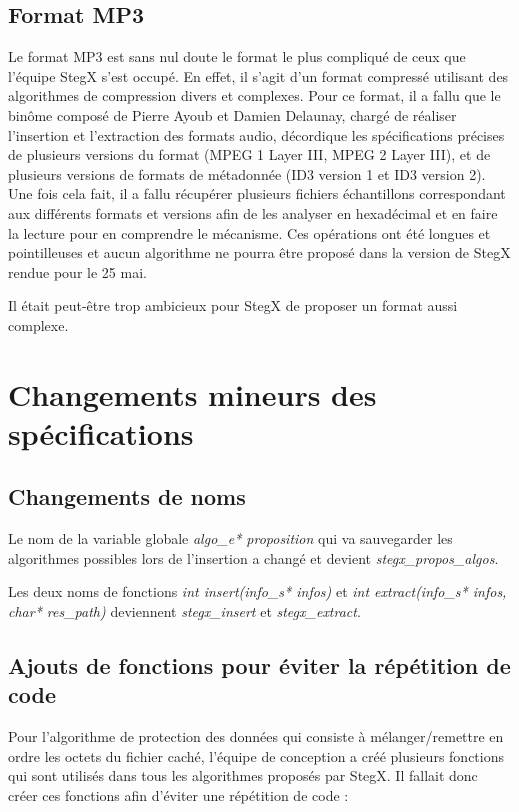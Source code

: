 \documentclass[11pt]{article}
\begin{document}
\subsection{Format MP3}

Le format MP3 est sans nul doute le format le plus compliqué de ceux
que l'équipe StegX s'est occupé. En effet, il s'agit d'un format compressé 
utilisant des algorithmes de compression divers et complexes. 
Pour ce format, il a fallu que le binôme composé de Pierre Ayoub et Damien 
Delaunay, chargé de réaliser l'insertion et l'extraction des formats audio, 
décordique les spécifications précises de plusieurs versions du format 
(MPEG 1 Layer III, MPEG 2 Layer III), et de plusieurs versions de formats 
de métadonnée (ID3 version 1 et ID3 version 2). 
Une fois cela fait, il a fallu récupérer plusieurs fichiers échantillons 
correspondant aux différents formats et versions afin de les analyser en 
hexadécimal et en faire la lecture pour en comprendre le mécanisme. Ces 
opérations ont été longues et pointilleuses et aucun algorithme ne pourra 
être proposé dans la version de StegX rendue pour le 25 mai. 

Il était peut-être trop ambicieux pour StegX de proposer un format aussi 
complexe. 

\section{Changements mineurs des spécifications}

\subsection{Changements de noms}

Le nom de la variable globale \textit{algo\_e* proposition} qui va sauvegarder 
les algorithmes possibles lors de l'insertion a changé et devient 
\textit{stegx\_propos\_algos}. 

Les deux noms de fonctions \textit{int insert(info\_s* infos)} et 
\textit{int extract(info\_s* infos, char* res\_path)} deviennent 
\textit{stegx\_insert} et \textit{stegx\_extract}. 

\subsection{Ajouts de fonctions pour éviter la répétition de code}

Pour l'algorithme de protection des données qui consiste à mélanger/remettre
en ordre les octets du fichier caché, l'équipe de conception a créé plusieurs 
fonctions qui sont utilisés dans tous les algorithmes proposés par StegX. 
Il fallait donc créer ces fonctions afin d'éviter une répétition de code :
 
\end{document}
